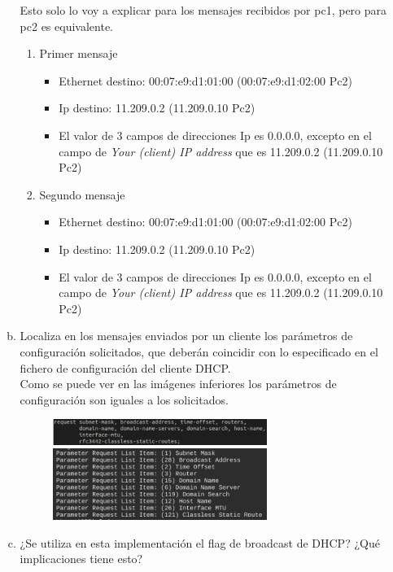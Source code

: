 \documentclass[12pt, a4paper]{report}
\begin{document}
\begin{enumerate}
\begin{enumerate}[a)]
		Esto solo lo voy a explicar para los mensajes recibidos por pc1, pero para pc2 es equivalente.
		\begin{enumerate}
			\item Primer mensaje
			\begin{itemize}
				\item Ethernet destino: 00:07:e9:d1:01:00 (00:07:e9:d1:02:00 Pc2)
				\item Ip destino: 11.209.0.2 (11.209.0.10 Pc2)
				\item El valor de 3 campos de direcciones Ip es 0.0.0.0, excepto en el campo de \textit{Your (client) IP address} que es 11.209.0.2 (11.209.0.10 Pc2)
			\end{itemize}
			\item Segundo mensaje
			\begin{itemize}
				\item Ethernet destino: 00:07:e9:d1:01:00 (00:07:e9:d1:02:00 Pc2)
				\item Ip destino: 11.209.0.2 (11.209.0.10 Pc2)
				\item El valor de 3 campos de direcciones Ip es 0.0.0.0, excepto en el campo de \textit{Your (client) IP address} que es 11.209.0.2 (11.209.0.10 Pc2)
			\end{itemize}
		\end{enumerate}
		\item Localiza en los mensajes enviados por un cliente los parámetros de configuración solicitados, que
		deberán coincidir con lo especificado en el fichero de configuración del cliente DHCP.\\
		
		Como se puede ver en las imágenes inferiores los parámetros de configuración son iguales a los solicitados.
		\begin{figure}[!h]
			\centering
			\includegraphics[width=0.7\textwidth]{ej5_4_2}
			\includegraphics[width=0.7\textwidth]{ej5_5_2}
		\end{figure}
		\item ¿Se utiliza en esta implementación el flag de broadcast de DHCP? ¿Qué implicaciones tiene esto?\\
		

\end{enumerate}
\end{enumerate}
\end{document}

